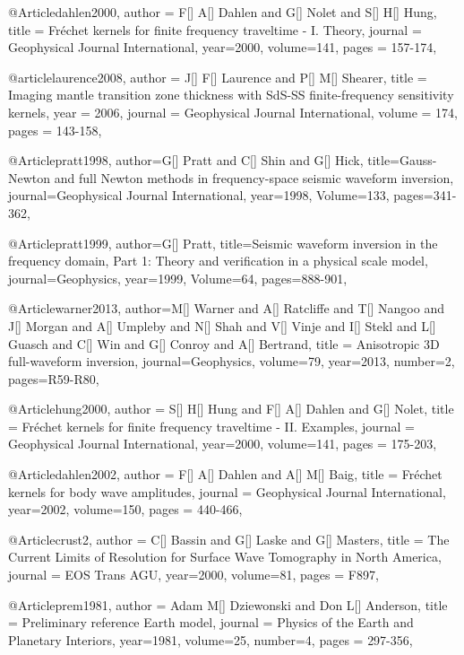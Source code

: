 @Article{dahlen2000,
  author =	 {F[] A[] Dahlen and G[] Nolet and S[] H[] Hung},
  title =	 {Fr\'{e}chet kernels for finite frequency traveltime - {I}. Theory},
  journal =	 {Geophysical Journal International},
  year=2000,
  volume=141,
  pages =	 {157-174},
}

@article{laurence2008,
author = {J[] F[] Laurence and P[] M[] Shearer},
title = {Imaging mantle transition zone thickness with {S}d{S-SS} finite-frequency sensitivity kernels},
year = {2006},
journal = {Geophysical Journal International},
volume = {174},
pages = {143-158},
}

@Article{pratt1998,
  author={G[] Pratt and C[] Shin and G[] Hick},
  title={Gauss-{N}ewton and full {N}ewton methods in frequency-space seismic waveform inversion},
  journal={Geophysical Journal International},
  year=1998,
  Volume=133,
  pages={341-362},
}

@Article{pratt1999,
  author={G[] Pratt},
  title={Seismic waveform inversion in the frequency domain, {P}art 1: {T}heory and verification in a physical scale model},
  journal={Geophysics},
  year=1999,
  Volume=64,
  pages={888-901},
}

@Article{warner2013,
  author={M[] Warner and A[] Ratcliffe and T[] Nangoo and J[] Morgan and A[] Umpleby and N[] Shah and V[] Vinje and I[] Stekl and L[] Guasch and C[] Win and G[] Conroy and A[] Bertrand},
  title = {Anisotropic 3{D} full-waveform inversion},
  journal={Geophysics},
  volume=79,
  year=2013,
  number=2,
  pages={R59-R80},
}

@Article{hung2000,
  author =	 {S[] H[] Hung and F[] A[] Dahlen and G[] Nolet},
  title =	 {Fr\'{e}chet kernels for finite frequency traveltime - {II}. Examples},
  journal =	 {Geophysical Journal International},
  year=2000,
  volume=141,
  pages =	 {175-203},
}


@Article{dahlen2002,
  author =	 {F[] A[] Dahlen and A[] M[] Baig},
  title =	 {Fr\'{e}chet kernels for body wave amplitudes},
  journal =	 {Geophysical Journal International},
  year=2002,
  volume=150,
  pages =	 {440-466},
}


@Article{crust2,
  author =	 {C[] Bassin and G[] Laske and G[] Masters},
  title =	 {The Current Limits of Resolution for Surface Wave Tomography in North America},
  journal =	 {EOS Trans AGU},
  year=2000,
  volume=81,
  pages =	 {F897},
}

@Article{prem1981,
  author =	 {Adam M[] Dziewonski and Don L[] Anderson},
  title =	 {Preliminary reference Earth model},
  journal =	 {Physics of the Earth and Planetary Interiors},
  year=1981,
  volume=25,
  number=4,
  pages =	 {297-356},
}



